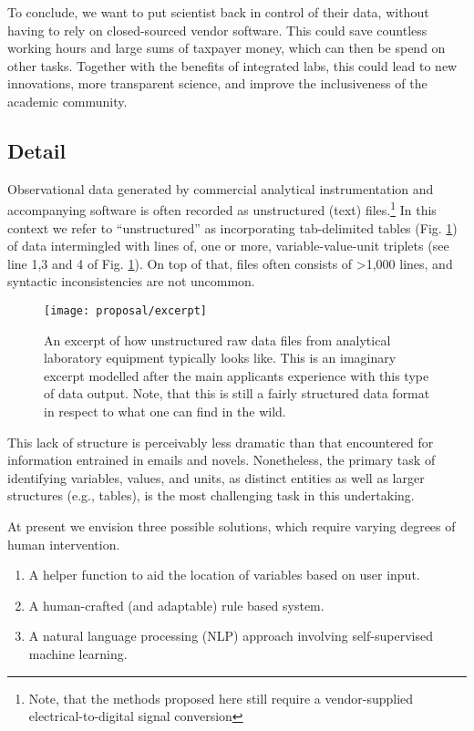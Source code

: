 \documentclass[]{article}
\providecommand{\tightlist}{%
  \setlength{\itemsep}{0pt}\setlength{\parskip}{0pt}}
\begin{document}
To conclude, we want to put scientist back in control of their data, without having to rely on closed-sourced vendor software. This could save countless working hours and large sums of taxpayer money, which can then be spend on other tasks. Together with the benefits of integrated labs, this could lead to new innovations, more transparent science, and improve the inclusiveness of the academic community.

\hypertarget{sec:Detail}{%
\subsection{Detail}\label{sec:Detail}}

Observational data generated by commercial analytical instrumentation and accompanying software is often recorded as unstructured (text) files.\footnote{Note, that the methods proposed here still require a vendor-supplied electrical-to-digital signal conversion} In this context we refer to ``unstructured'' as incorporating tab-delimited tables (Fig. \ref{fig:input}) of data intermingled with lines of, one or more, variable-value-unit triplets (see line 1,3 and 4 of Fig. \ref{fig:input}). On top of that, files often consists of \textgreater{}1,000 lines, and syntactic inconsistencies are not uncommon.

\begin{figure}
\texttt{[image: proposal/excerpt]} \caption{An excerpt of how unstructured raw data files from analytical laboratory equipment typically looks like. This is an imaginary excerpt modelled after the main applicants experience with this type of data output. Note, that this is still a fairly structured data format in respect to what one can find in the wild.}\label{fig:input}
\end{figure}

This lack of structure is perceivably less dramatic than that encountered for information entrained in emails and novels. Nonetheless, the primary task of identifying variables, values, and units, as distinct entities as well as larger structures (e.g., tables), is the most challenging task in this undertaking.

At present we envision three possible solutions, which require varying degrees of human intervention.

\begin{enumerate}
\def\labelenumi{\arabic{enumi}.}
\tightlist
\item
  A helper function to aid the location of variables based on user input.
\item
  A human-crafted (and adaptable) rule based system.
\item
  A natural language processing (NLP) approach involving self-supervised machine learning.
\end{enumerate}
\end{document}
